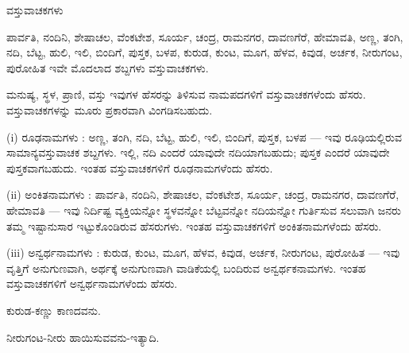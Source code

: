 \vspace{2.5pt plus 3pt minus 0.5pt}\noindent\hspace*{1.2em}\hspace{0.55em}ವಸ್ತುವಾಚಕಗಳು\par

\indent ಪಾರ್ವತಿ, ನಂದಿನಿ, ಶೇಷಾಚಲ, ವೆಂಕಟೇಶ, ಸೂರ್ಯ, ಚಂದ್ರ, ರಾಮನಗರ, ದಾವಣಗೆರೆ, ಹೇಮಾವತಿ, ಅಣ್ಣ, ತಂಗಿ, ನದಿ, ಬೆಟ್ಟ, ಹುಲಿ, ಇಲಿ, ಬಿಂದಿಗೆ, ಪುಸ್ತಕ, ಬಳಪ, ಕುರುಡ, ಕುಂಟ, ಮೂಗ, ಹೆಳವ, ಕಿವುಡ, ಅರ್ಚಕ, ನೀರುಗಂಟ, ಪುರೋಹಿತ ಇವೇ ಮೊದಲಾದ ಶಬ್ದಗಳು ವಸ್ತುವಾಚಕಗಳು.\par

\begin{kbvrule}
\hspace{0.5em}ಮನುಷ್ಯ, ಸ್ಥಳ, ಪ್ರಾಣಿ, ವಸ್ತು ಇವುಗಳ ಹೆಸರನ್ನು ತಿಳಿಸುವ ನಾಮಪದಗಳಿಗೆ ವಸ್ತುವಾಚಕಗಳೆಂದು ಹೆಸರು. ವಸ್ತುವಾಚಕಗಳನ್ನು ಮೂರು ಪ್ರಕಾರವಾಗಿ ವಿಂಗಡಿಸಬಹುದು.
\end{kbvrule}

\indent ({\kbvlatin i}) ರೂಢನಾಮಗಳು : ಅಣ್ಣ, ತಂಗಿ, ನದಿ, ಬೆಟ್ಟ, ಹುಲಿ, ಇಲಿ, ಬಿಂದಿಗೆ, ಪುಸ್ತಕ, ಬಳಪ — ಇವು ರೂಢಿಯಲ್ಲಿರುವ ಸಾಮಾನ್ಯವಸ್ತುವಾಚಕ ಶಬ್ದಗಳು. ಇಲ್ಲಿ, ನದಿ ಎಂದರೆ ಯಾವುದೇ ನದಿಯಾಗಬಹುದು; ಪುಸ್ತಕ ಎಂದರೆ ಯಾವುದೇ ಪುಸ್ತಕವಾಗಬಹುದು. ಇಂತಹ ವಸ್ತುವಾಚಕಗಳಿಗೆ ರೂಢನಾಮಗಳೆಂದು ಹೆಸರು.\par

\indent ({\kbvlatin ii}) ಅಂಕಿತನಾಮಗಳು : ಪಾರ್ವತಿ, ನಂದಿನಿ, ಶೇಷಾಚಲ, ವೆಂಕಟೇಶ, ಸೂರ್ಯ, ಚಂದ್ರ, ರಾಮನಗರ, ದಾವಣಗೆರೆ, ಹೇಮಾವತಿ — ಇವು ನಿರ್ದಿಷ್ಟ ವ್ಯಕ್ತಿಯನ್ನೋ ಸ್ಥಳವನ್ನೋ ಬೆಟ್ಟವನ್ನೋ ನದಿಯನ್ನೋ ಗುರ್ತಿಸುವ ಸಲುವಾಗಿ ಜನರು ತಮ್ಮ ಇಷ್ಟಾನುಸಾರ ಇಟ್ಟುಕೊಂಡಿರುವ ಹೆಸರುಗಳು. ಇಂತಹ ವಸ್ತುವಾಚಕಗಳಿಗೆ ಅಂಕಿತನಾಮಗಳೆಂದು ಹೆಸರು.\par

\indent ({\kbvlatin iii}) ಅನ್ವರ್ಥನಾಮಗಳು : ಕುರುಡ, ಕುಂಟ, ಮೂಗ, ಹೆಳವ, ಕಿವುಡ, ಅರ್ಚಕ, ನೀರುಗಂಟ, ಪುರೋಹಿತ — ಇವು ವೃತ್ತಿಗೆ ಅನುಗುಣವಾಗಿ, ಅರ್ಥಕ್ಕೆ ಅನುಗುಣವಾಗಿ ವಾಡಿಕೆಯಲ್ಲಿ ಬಂದಿರುವ ಅನ್ವರ್ಥಕನಾಮಗಳು. ಇಂತಹ ವಸ್ತುವಾಚಕಗಳಿಗೆ ಅನ್ವರ್ಥನಾಮಗಳೆಂದು ಹೆಸರು.\par

\begin{kbvnote}
\hspace{0.5em}ಕುರುಡ-ಕಣ್ಣು ಕಾಣದವನು.
\end{kbvnote}

\noindent\hspace*{2.2em}ನೀರುಗಂಟ-ನೀರು ಹಾಯಿಸುವವನು-ಇತ್ಯಾದಿ.\par
